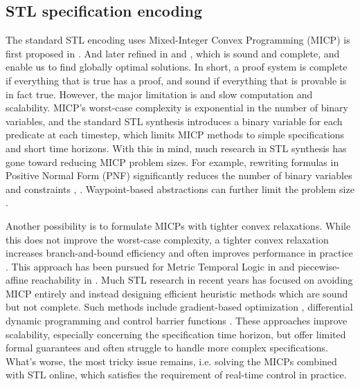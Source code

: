 \documentclass[a4paper]{report}
\begin{document}
\subsection{STL specification encoding} 
The standard STL encoding uses Mixed-Integer Convex Programming (MICP) is first proposed in \cite[]{raman2014model}. And later refined in \cite[]{sadraddini2015robust} and \cite[]{sadraddini2018formal}, which is sound and complete, and enable us to find globally optimal solutions. In short, a proof system is complete if everything that is true has a proof, and sound if everything that is provable is in fact true. However, the major limitation is and slow computation and scalability. MICP’s worst-case complexity is exponential in the number of binary variables, and the standard STL synthesis introduces a binary variable for each predicate at each timestep, which limits MICP methods to simple specifications and short time horizons. With
this in mind, much research in STL synthesis has gone toward reducing MICP problem sizes. For example, rewriting formulas in Positive Normal Form (PNF) significantly reduces the number of binary variables and constraints \cite[]{raman2014model}, \cite[]{sadraddini2018formal}. Waypoint-based abstractions can further limit the problem
size \cite[]{conforti2014integer}.

Another possibility is to formulate MICPs with tighter convex relaxations. While this does not improve the worst-case complexity, a tighter convex relaxation increases branch-and-bound efficiency and often improves performance in practice \cite[]{conforti2014integer}. This approach has been pursued for Metric Temporal Logic in \cite[]{kurtz2021more} and piecewise-affine reachability in \cite[]{marcucci2021shortest}. Much STL research in recent years has focused on avoiding MICP entirely and instead designing efficient heuristic methods
which are sound but not complete. Such methods include gradient-based optimization \cite[]{gilpin2020smooth} \cite[]{mehdipour2019arithmetic} \cite[]{leung2020back}, differential dynamic programming \cite[]{kurtz2020trajectory} and control barrier functions \cite[]{lindemann2018control}. These approaches improve scalability, especially concerning the specification time horizon, but offer limited formal guarantees and often struggle to handle more complex specifications. What's worse, the most tricky issue remains, i.e. solving the MICPs combined with STL online, which satisfies the requirement of real-time control in practice.
\end{document}
